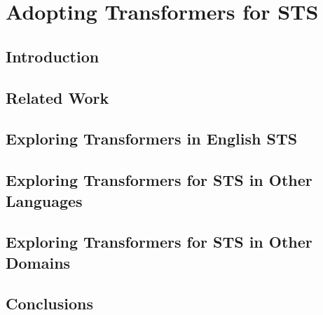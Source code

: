 \chapter{\label{cha:sts_transformers}Adopting Transformers for STS}

\section{Introduction}
\cite{devlin-etal-2019-bert}
\section{Related Work}

\section{Exploring Transformers in English STS}

\section{Exploring Transformers for STS in Other Languages}

\section{Exploring Transformers for STS in Other Domains}

\section{Conclusions}